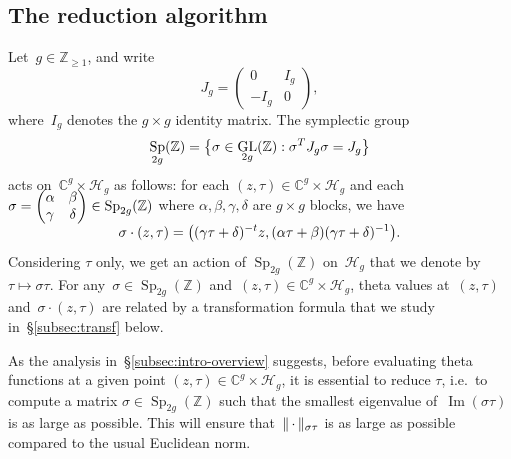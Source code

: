 \documentclass[12pt,oneside]{amsart}
\numberwithin{equation}{section}
\theoremstyle{definition}
\newcommand{\Z}{\mathbb{Z}}
\newcommand{\C}{\mathbb{C}}
\newcommand{\Half}{\mathcal{H}}
\newcommand{\placeholder}{\,\cdot\,}
\DeclareMathOperator{\im}{Im}
\DeclareMathOperator{\Sp}{Sp}
\DeclareMathOperator{\GL}{GL}
\DeclarePairedDelimiter{\paren}{(}{)}
\DeclarePairedDelimiter{\braces}{\{}{\}}
\DeclarePairedDelimiter{\norm}{\|}{\|}
\begin{document}
\subsection{The reduction algorithm}
\label{subsec:reduction-overview}

Let~$g\in \Z_{\geq 1}$, and write
\begin{equation}
 \label{eq:Jg}
J_g = \begin{pmatrix} 0 & I_g \\ -I_g & 0 \end{pmatrix},
\end{equation}
where~$I_g$ denotes the $g\times g$ identity matrix. The symplectic group
\begin{equation}
  \label{eq:Sp}
  \Sp_{2g}(\Z) = \braces[\big]{\sigma\in \GL_{2g}(\Z): \sigma^T J_g\sigma = J_g}
\end{equation}
acts on~$\C^g\times \Half_g$ as follows: for each
$(z,\tau)\in \C^g\times \Half_g$ and each
$\sigma = \smash{\begin{pmatrix} \alpha & \beta \\ \gamma & \delta \end{pmatrix}}
\in \Sp_{2g}(\Z)$ where $\alpha,\beta,\gamma,\delta$ are $g\times g$ blocks, we have
\begin{equation}
  \label{eq:action}
  \sigma \cdot (z,\tau) = \paren[\big]{(\gamma\tau + \delta)^{-t}z,
    (\alpha\tau + \beta)(\gamma\tau + \delta)^{-1}}.
\end{equation}
Considering $\tau$ only, we get an action of $\Sp_{2g}(\Z)$ on~$\Half_g$ that
we denote by $\tau\mapsto \sigma\tau$. For any~$\sigma\in \Sp_{2g}(\Z)$
and~$(z,\tau)\in \C^g\times \Half_g$, theta values at~$(z,\tau)$
and~$\sigma\cdot(z,\tau)$ are related by a transformation formula that we study
in~§\ref{subsec:transf} below.

As the analysis in~§\ref{subsec:intro-overview} suggests, before evaluating
theta functions at a given point $(z,\tau) \in \C^g\times \Half_g$, it is
essential to reduce $\tau$, i.e.~to compute a matrix $\sigma\in \Sp_{2g}(\Z)$
such that the smallest eigenvalue of~$\im(\sigma\tau)$ is as large as
possible. This will ensure that~$\norm{\placeholder}_{\sigma\tau}$ is as large
as possible compared to the usual Euclidean norm.
\end{document}
